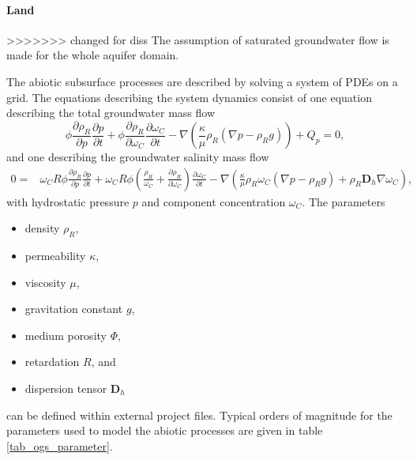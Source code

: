 \paragraph{Land}
>>>>>>> changed for diss
The assumption of saturated groundwater flow is made for the whole aquifer domain.

The abiotic subsurface processes are described by solving a system of PDEs on a grid. The equations describing the system dynamics consist of one equation describing the total groundwater mass flow 
\begin{equation}
\phi\frac{\partial  \rho_R}{\partial p}\frac{\partial p}{\partial t} + \phi\frac{\partial \rho_R}{\partial \omega_C}\frac{\partial \omega_C}{\partial t} - \nabla \left(\frac{\kappa}{\mu}\rho_R \left(\nabla p - \rho_R g \right)\right) + Q_p = 0,
\end{equation}
and one describing the groundwater salinity mass flow
\begin{equation}
\begin{split}
0 =&
\omega_C R\phi\frac{\partial  \rho_R }{\partial p}\frac{\partial p}{\partial t}+\omega_C R\phi\left(\frac{\rho_R}{\omega_C}+\frac{\partial  \rho_R }{\partial \omega_C}\right)\frac{\partial \omega_C}{\partial t} - \nabla \left(  \frac{\kappa}{\mu} \rho_R \omega_C \left(\nabla p - \rho_R g \right) + \rho_R \mathbf{D}_h \nabla \omega_C\right),
\end{split}
\end{equation}
with hydrostatic pressure $p$ and component concentration $\omega_C$. 
The parameters 
\begin{itemize}
\item density $\rho_R$,
\item permeability $\kappa$,
\item viscosity $\mu$,
\item gravitation constant $g$,
\item medium porosity $\Phi$,
\item retardation $R$, and
\item dispersion tensor $\mathbf{D}_h$
\end{itemize}
can be defined within external project files.
Typical orders of magnitude for the parameters used to model the abiotic processes are given in table \ref{tab_ogs_parameter}.
